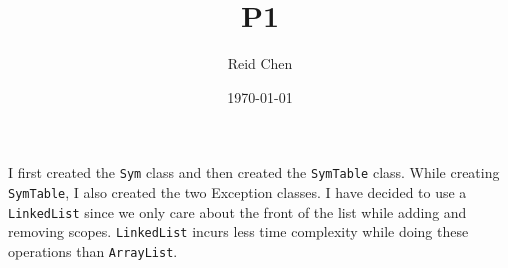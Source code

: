 \documentclass[11pt]{article}
\author{Reid Chen}
\date{\today}
\title{P1}
\begin{document}
\maketitle
\tableofcontents

I first created the \texttt{Sym} class and then created the \texttt{SymTable} class. While
creating \texttt{SymTable}, I also created the two Exception classes. I have decided to
use a \texttt{LinkedList} since we only care about the front of the list while adding
and removing scopes. \texttt{LinkedList} incurs less time complexity while doing these
operations than \texttt{ArrayList}.
\end{document}
